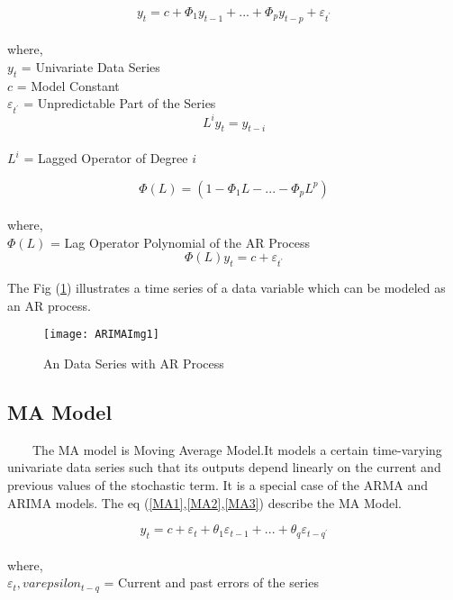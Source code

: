 \begin{equation}
\label{AR1}
y_{t} = c + \Phi_{1}y_{t-1} + ... + \Phi_{p}y_{t-p} + \varepsilon_{t^{'}}
\end{equation}\\
where,\\
$ y_{t} $ = Univariate Data Series \\
$ c $ = Model Constant  \\ 
$ \varepsilon_{t^{'}} $ = Unpredictable Part of the Series  \\ 

\begin{equation}
\label{AR2}
L^{i}y_{t} = y_{t-i}
\end{equation}\\
$ L^{i} $ = Lagged Operator of Degree $ i $


\begin{equation}
\label{AR3}
\Phi(L) = ( 1 - \Phi_{1}L - ... - \Phi_{p}L^{p} )
\end{equation}\\
where,\\
$ \Phi(L) $ = Lag Operator Polynomial of the AR Process\\

\begin{equation}
\label{AR4}
\Phi(L)y_{t} = c + \varepsilon_{t^{'}}
\end{equation}

The Fig (\ref{figc7h1}) illustrates a time series of a data variable which can be modeled as an AR process.

\begin{figure}[H]
\centering
\texttt{[image: ARIMAImg1]}
\caption{An Data Series with AR Process}
\label{figc7h1} %
\end{figure}

\subsection{MA Model}
\
\
\
\
The MA model is Moving Average Model.It models a certain time-varying univariate data series such that its outputs depend linearly on the current and previous values of the stochastic term. It is a special case of the ARMA and ARIMA models.
The eq (\ref{MA1},\ref{MA2},\ref{MA3}) describe the MA Model.

\begin{equation}
\label{MA1}
y_{t}= c + \varepsilon_{t} + \theta_{1}\varepsilon_{t-1} + ... + \theta_{q}\varepsilon_{t-q^{'}}
\end{equation}\\
where,\\
$ \varepsilon_{t}, varepsilon_{t-q} $ = Current and past errors of the series \\
 

